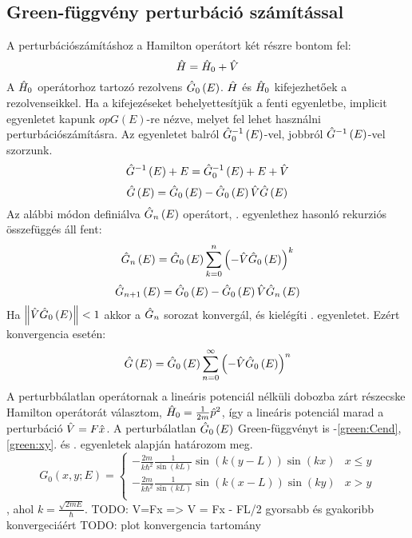 \subsection{Green-függvény perturbáció számítással}
A perturbációszámításhoz a Hamilton operátort két részre bontom fel:
\begin{equation}
	\hat{H} = \hat{H}_0 + \hat{V}
\end{equation}
A $\hat{H}_0$ operátorhoz tartozó rezolvens $\hat{G}_0\left(E\right)$. $\hat{H}$ és $\hat{H}_0$ kifejezhetőek a rezolvenseikkel. Ha a kifejezéseket behelyettesítjük a fenti egyenletbe, implicit egyenletet kapunk $op{G}\left(E\right)$-re nézve, melyet fel lehet használni perturbációszámításra. Az egyenletet balról $\hat{G}_0^{-1}\left(E\right)$-vel, jobbról $\hat{G}^{-1}\left(E\right)$-vel szorzunk.
\begin{equation}
	\hat{G}^{-1}\left(E\right) + E = \hat{G}_0^{-1}\left(E\right) + E + \hat{V}
\end{equation}
\begin{equation}
	\hat{G}\left(E\right) = \hat{G}_0\left(E\right) - \hat{G}_0\left(E\right)\hat{V}\hat{G}\left(E\right)
	\label{green:pertmaster}
\end{equation}
Az alábbi módon definiálva $\hat{G}_n\left(E\right)$ operátort, . egyenlethez hasonló rekurziós összefüggés áll fent:
\begin{equation}
	\hat{G}_n\left(E\right) = \hat{G}_0\left(E\right)\sum_{k=0}^n\left(-\hat{V}\hat{G}_0\left(E\right)\right)^k
\end{equation}
\begin{equation}
	\hat{G}_{n+1}\left(E\right) = \hat{G}_0\left(E\right) - \hat{G}_0\left(E\right)\hat{V}\hat{G}_n\left(E\right)
\end{equation}
Ha $\left\lVert\hat{V}\hat{G}_0\left(E\right)\right\rVert < 1$ akkor a $\hat{G}_n$ sorozat konvergál, és kielégíti . egyenletet. Ezért konvergencia esetén:
\begin{equation}
	\hat{G}\left(E\right) = \hat{G}_0\left(E\right)\sum_{n=0}^\infty\left(-\hat{V}\hat{G}_0\left(E\right)\right)^n
\end{equation}
A perturbbálatlan operátornak a lineáris potenciál nélküli dobozba zárt részecske Hamilton operátorát választom, $\hat{H}_0=\frac{1}{2m}\hat{p}^2$, így a lineáris potenciál marad a perturbáció $\hat{V} = F\hat{x}$. A perturbálatlan $\hat{G}_0\left(E\right)$ Green-függvényt is -\ref{green:Cend}, \ref{green:xy}. és . egyenletek alapján határozom meg.
\begin{equation}
	G_0\left(x,y;E\right) =
	\begin{cases}
		-\frac{2m}{k\hbar^2}\frac{1}{\sin\left(kL\right)} \sin\left(k\left(y-L\right)\right)\sin\left(kx\right) & x\leq y\\
		-\frac{2m}{k\hbar^2}\frac{1}{\sin\left(kL\right)} \sin\left(k\left(x-L\right)\right)\sin\left(ky\right) & x>y\\
	\end{cases}
\end{equation}
, ahol $k = \frac{\sqrt{2mE}}{\hbar}$.
TODO: V=Fx => V = Fx - FL/2 gyorsabb és gyakoribb konvergeciáért
TODO: plot konvergencia tartomány






